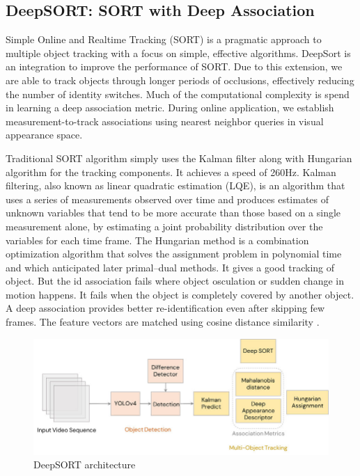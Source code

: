 \subsection{DeepSORT: SORT with Deep Association}
Simple Online and Realtime Tracking (SORT) \cite{sort} is a pragmatic approach to multiple object tracking with a focus on simple, effective algorithms. DeepSort \cite{deepsort} is an integration to improve the performance of SORT. Due to this extension, we are able to track objects through longer periods of occlusions, effectively reducing the number of identity switches. Much of the computational complexity is spend in learning a deep association metric. During online application, we establish measurement-to-track associations using nearest neighbor queries in visual appearance space. 

Traditional SORT algorithm simply uses the Kalman filter along with Hungarian algorithm for the tracking components. It achieves a speed of 260Hz. Kalman filtering, also known as linear quadratic estimation (LQE), is an algorithm that uses a series of measurements observed over time and produces estimates of unknown variables that tend to be more accurate than those based on a single measurement alone, by estimating a joint probability distribution over the variables for each time frame. The Hungarian method is a combination optimization algorithm that solves the assignment problem in polynomial time and which anticipated later primal–dual methods. It gives a good tracking of object. But the id association fails where object osculation or sudden change in motion happens. It fails when the object is completely covered by another object. A deep association provides better re-identification even after skipping few frames. The feature vectors are matched using cosine distance similarity \cite{deep_cosine}.

\begin{figure}[h!]
	\centering
	\includegraphics[width=0.8\linewidth]{Images/deepsort}
	\caption{DeepSORT architecture}
	\label{fig:deepsort}
\end{figure}


